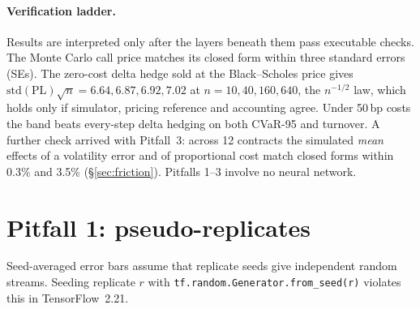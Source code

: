 \documentclass{article}
\newcommand{\cvar}{CVaR-95}
\newcommand{\bps}{\,bp}
\begin{document}
\paragraph{Verification ladder.} Results are interpreted only after the layers beneath them pass
executable checks. The Monte Carlo call price matches its closed form within three standard
errors (SEs). The zero-cost delta hedge sold at the Black--Scholes price gives
$\mathrm{std}(\mathrm{PL})\sqrt{n} = 6.64, 6.87, 6.92, 7.02$ at $n = 10, 40, 160, 640$, the
$n^{-1/2}$ law, which holds only if simulator, pricing reference and accounting agree. Under
50\bps{} costs the band beats every-step delta hedging on both \cvar{} and turnover. A further
check arrived with Pitfall~3: across 12 contracts the simulated \emph{mean} effects of a volatility
error and of proportional cost match closed forms within 0.3\% and 3.5\%
(\S\ref{sec:friction}). Pitfalls 1--3 involve no neural network.

\section{Pitfall 1: pseudo-replicates}\label{sec:seeds}

Seed-averaged error bars assume that replicate seeds give independent random streams. Seeding
replicate $r$ with \texttt{tf.random.Generator.from\_seed(r)} violates this in TensorFlow~2.21.
\end{document}
